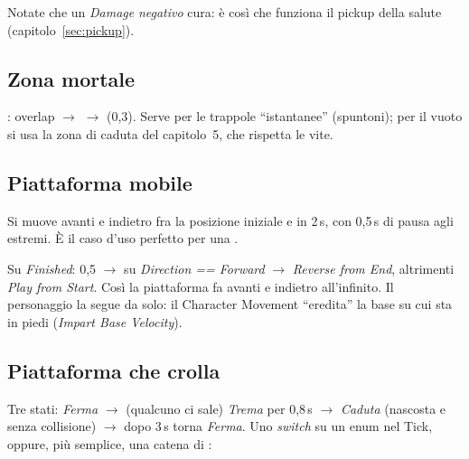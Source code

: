 Notate che un \emph{Damage} \emph{negativo} cura: è così che funziona il pickup della salute (capitolo~\ref{sec:pickup}).

\subsection{Zona mortale}

: overlap $\rightarrow$  $\rightarrow$ (0,3). Serve per le trappole ``istantanee'' (spuntoni); per il vuoto si usa la zona di caduta del capitolo~5, che rispetta le vite.

\subsection{Piattaforma mobile}

Si muove avanti e indietro fra la posizione iniziale e  in 2\,s, con 0,5\,s di pausa agli estremi. È il caso d'uso perfetto per una .

\begin{bpgraph}
\end{bpgraph}

Su \emph{Finished}:  0,5 $\rightarrow$  su \emph{Direction == Forward} $\rightarrow$ \emph{Reverse from End}, altrimenti \emph{Play from Start}. Così la piattaforma fa avanti e indietro all'infinito. Il personaggio la segue da solo: il Character Movement ``eredita'' la base su cui sta in piedi (\emph{Impart Base Velocity}).

\subsection{Piattaforma che crolla}

Tre stati: \emph{Ferma} $\rightarrow$ (qualcuno ci sale) \emph{Trema} per 0,8\,s $\rightarrow$ \emph{Caduta} (nascosta e senza collisione) $\rightarrow$ dopo 3\,s torna \emph{Ferma}. Uno \emph{switch} su un enum  nel Tick, oppure, più semplice, una catena di :

